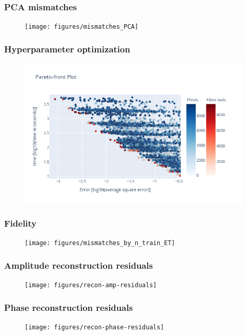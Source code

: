 \documentclass{beamer}
\begin{document}
\begin{frame}
    \frametitle{PCA mismatches}
    \begin{figure}[ht]
    \centering
    \texttt{[image: figures/mismatches\_PCA]}
    \label{fig:mismatches_PCA}
    \end{figure}
\end{frame}

\begin{frame}
    \frametitle{Hyperparameter optimization}
    \begin{figure}[ht]
    \centering
    \includegraphics[width=\textwidth]{figures/pareto-front}
    \label{fig:pareto-front-nonspinning}
    \end{figure}
\end{frame}

\begin{frame}
    \frametitle{Fidelity}
    \begin{figure}[ht]
    \centering
    \texttt{[image: figures/mismatches\_by\_n\_train\_ET]}
    \end{figure}
\end{frame}

\begin{frame}
    \frametitle{Amplitude reconstruction residuals}
    \begin{figure}[ht]
    \centering
    \texttt{[image: figures/recon-amp-residuals]}
    \label{fig:recon-amp-residuals}
    \end{figure}
\end{frame}

\begin{frame}
    \frametitle{Phase reconstruction residuals}
    \begin{figure}[ht]
    \centering
    \texttt{[image: figures/recon-phase-residuals]}
    \label{fig:recon-phase-residuals}
    \end{figure}
\end{frame}
\end{document}
